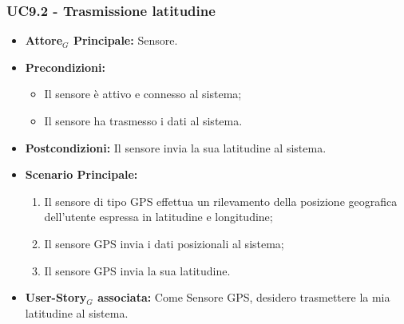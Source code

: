 \documentclass[11pt]{article}
\begin{document}
\begin{justify}
\subsubsection{\textbf{UC9.2 - Trasmissione latitudine}}
\begin{itemize}
    \item \textbf{Attore$_G$ Principale:} Sensore.
    \item \textbf{Precondizioni:} 
        \begin{itemize}
    	\item Il sensore è attivo e connesso al sistema;
          \item Il sensore ha trasmesso i dati al sistema.
        \end{itemize}
    \item \textbf{Postcondizioni:} Il sensore invia la sua latitudine al sistema.
    \item \textbf{Scenario Principale:} 
        \begin{enumerate}
            \item Il sensore di tipo GPS effettua un rilevamento della posizione geografica dell'utente espressa in latitudine e longitudine;
            \item Il sensore GPS invia i dati posizionali al sistema;
            \item Il sensore GPS invia la sua latitudine.
        \end{enumerate}
    \item \textbf{User-Story$_G$ associata:} Come Sensore GPS, desidero trasmettere la mia latitudine al sistema.
\end{itemize}

\end{justify}
\end{document}
